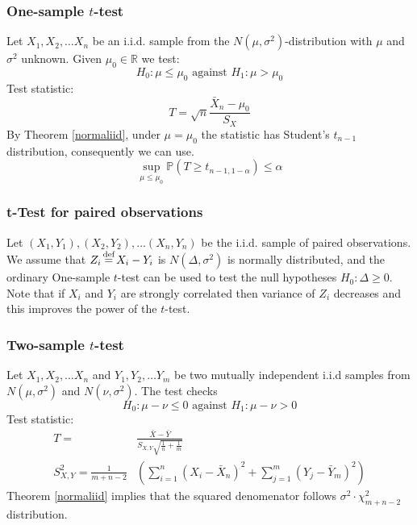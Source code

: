 \documentclass[12pt]{article}
\theoremstyle{definition}
\theoremstyle{remark}
\numberwithin{equation}{section}
\newcommand{\RR}{\mathbb{R}}
\newcommand{\PP}{\mathbb{P}}
\newcommand{\eq}{\stackrel{\mathclap{\normalfont\text{def}}}{=}}
\begin{document}
\subsubsection{One-sample $t$-test}
Let $X_1, X_2,\ldots X_n$ be an i.i.d. sample from the $N(\mu, \sigma^2)$-distribution with $\mu$ and $\sigma^2$ unknown. Given $\mu_0\in\RR$ we test:
\begin{equation}\label{ttest}
	H_0:\mu\leq \mu_0 \text{ against } H_1: \mu>\mu_0
\end{equation}
Test statistic:
\begin{equation}\label{tstatistic}
	T = \sqrt{n}\frac{\bar X_n - \mu_0}{S_X}
\end{equation}
By Theorem \ref{normaliid}, under $\mu = \mu_0$ the statistic has Student's $t_{n-1}$ distribution, consequently we can use.
\begin{equation}
	\sup_{\mu\leq\mu_0}\PP \left(T \geq t_{n-1, 1-\alpha}\right) \leq \alpha
\end{equation}

\subsubsection{t-Test for paired observations}
Let $(X_1, Y_1), (X_2, Y_2),\ldots (X_n, Y_n)$ be the i.i.d. sample of paired observations. We assume that $Z_i \eq X_i - Y_i$ is $N(\Delta, \sigma^2)$ is normally distributed, and the ordinary One-sample $t$-test can be used to test the null hypotheses $H_0:\Delta\geq0$. Note that if $X_i$ and $Y_i$ are strongly correlated then variance of $Z_i$ decreases and this improves the power of the $t$-test.

\subsubsection{Two-sample $t$-test}
Let $X_1, X_2,\ldots X_n$ and $Y_1, Y_2,\ldots Y_m$ be two mutually independent i.i.d samples from $N(\mu, \sigma^2)$ and $N(\nu, \sigma^2)$. The test checks
\begin{equation}
	H_0:\mu-\nu \leq 0 \text{ against } H_1: \mu-\nu>0
\end{equation}
Test statistic:
\begin{align}
	T =& \frac{\bar{X} - \bar{Y}}{S_{X,Y}\sqrt{\frac1n+\frac1m}}\\
	S_{X,Y}^2 = \frac1{m+n-2}&\left(\sum_{i=1}^n (X_i - \bar X_n)^2+ \sum_{j=1}^m (Y_j - \bar Y_m)^2\right)
\end{align}
Theorem \ref{normaliid} implies that the squared denomenator follows $\sigma^2 \cdot \chi^2_{m+n-2}$ distribution.
\end{document}
